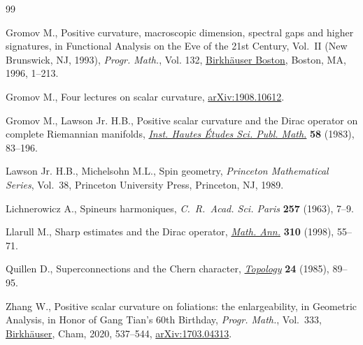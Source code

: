 \begin{thebibliography}{99}
\footnotesize\itemsep=0pt

Gromov M., Positive curvature, macroscopic dimension, spectral gaps and higher
 signatures, in Functional Analysis on the Eve of the 21st Century,
 {V}ol.~{II} ({N}ew {B}runswick, {NJ}, 1993), \textit{Progr. Math.}, Vol. 132,
 \href{https://doi.org/10.1007/s10107-010-0354-x}{Birkh\"{a}user Boston}, Boston, MA, 1996, 1--213.

Gromov M., Four lectures on scalar curvature, \href{https://arxiv.org/abs/1908.10612}{arXiv:1908.10612}.

Gromov M., Lawson Jr. H.B., Positive scalar curvature and the {D}irac operator
 on complete {R}iemannian manifolds, \href{https://doi.org/10.1007/BF02953774}{\textit{Inst. Hautes \'Etudes Sci. Publ. Math.}} \textbf{58} (1983), 83--196.

Lawson Jr. H.B., Michelsohn M.L., Spin geometry, \textit{Princeton Mathematical
 Series}, Vol.~38, Princeton University Press, Princeton, NJ, 1989.

Lichnerowicz A., Spineurs harmoniques, \textit{C.~R.~Acad. Sci. Paris} \textbf{257} (1963), 7--9.

Llarull M., Sharp estimates and the {D}irac operator, \href{https://doi.org/10.1007/s002080050136}{\textit{Math. Ann.}} \textbf{310} (1998), 55--71.

Quillen D., Superconnections and the {C}hern character, \href{https://doi.org/10.1016/0040-9383(85)90047-3}{\textit{Topology}} \textbf{24} (1985), 89--95.

Zhang W., Positive scalar curvature on foliations: the enlargeability, in
 Geometric Analysis, in Honor of Gang Tian's 60th Birthday, \textit{Progr.
 Math.}, Vol.~333, \href{https://doi.org/10.1007/978-3-030-34953-0_22}{Birkh\"auser}, Cham, 2020, 537--544, \href{https://arxiv.org/abs/1703.04313}{arXiv:1703.04313}.

\end{thebibliography}
